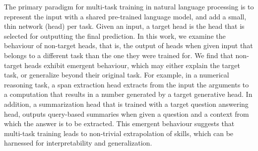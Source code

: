 The primary paradigm for multi-task training in natural language processing is to represent the input with a shared pre-trained language model, and add a small, thin network (head) per task. Given an input, a target head is the head that is selected for outputting the final prediction. In this work, we examine the behaviour of non-target heads, that is, the output of heads when given input that belongs to a different task than the one they were trained for. We find that non-target heads exhibit emergent behaviour, which may either explain the target task, or generalize beyond their original task. For example, in a numerical reasoning task, a span extraction head extracts from the input the arguments to a computation that results in a number generated by a target generative head. In addition, a summarization head that is trained with a target question answering head, outputs query-based summaries when given a question and a context from which the answer is to be extracted. This emergent behaviour suggests that multi-task training leads to non-trivial extrapolation of skills, which can be harnessed for interpretability and generalization.
